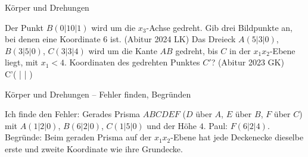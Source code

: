 \begin{aufgabe}{Körper und Drehungen}
\begin{teile}
\teil Der Punkt $B(0 | 10 | 1)$ wird um die $x_3$-Achse gedreht. Gib drei Bildpunkte an, bei denen eine Koordinate $6$ ist. \hfill (Abitur 2024 LK)
\teil Das Dreieck $A(5 | 3 | 0)$, $B(3 | 5 | 0)$, $C(3 | 3 | 4)$ wird um die Kante $AB$ gedreht, bis $C$ in der $x_1x_2$-Ebene liegt, mit $x_1 < 4$. Koordinaten des gedrehten Punktes $C'$? \hfill (Abitur 2023 GK) \\ C'( \leerfeld | \leerfeld | \leerfeld )
\end{teile}
\end{aufgabe}

\begin{aufgabe}{Körper und Drehungen – Fehler finden, Begründen}
\begin{teile}
\teil Ich finde den Fehler: Gerades Prisma $ABCDEF$ ($D$ über $A$, $E$ über $B$, $F$ über $C$) mit $A(1 | 2 | 0)$, $B(6 | 2 | 0)$, $C(1 | 5 | 0)$ und der Höhe $4$. Paul: $F(6 | 2 | 4)$.
\teil Begründe: Beim geraden Prisma auf der $x_1x_2$-Ebene hat jede Deckenecke dieselbe erste und zweite Koordinate wie ihre Grundecke.
\end{teile}
\end{aufgabe}
